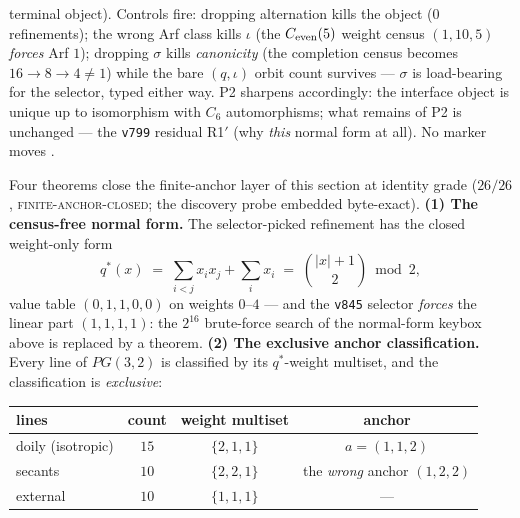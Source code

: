 \begin{keybox}
terminal object).  Controls fire: dropping alternation kills the
object ($0$ refinements); the wrong Arf class kills $\iota$ (the
$C_{\rm even}(5)$ weight census $(1,10,5)$ \emph{forces} Arf
$1$); dropping $\sigma$ kills \emph{canonicity} (the completion
census becomes $16 \to 8 \to 4 \ne 1$) while the bare
$(q,\iota)$ orbit count survives --- $\sigma$ is load-bearing
for the selector, typed either way.  P2 sharpens accordingly:
the interface object is unique up to isomorphism with $C_6$
automorphisms; what remains of P2 is unchanged --- the
\texttt{v799} residual R1$'$ (why \emph{this} normal form at
all).  No marker moves \mE.
\end{keybox}

\begin{keybox}[The four finite anchor theorems (2026-08-09) --- the census-free $q^{*}$, the exclusive anchor classification, the doily as a multiplication table, and the $g=5$ exhaustion \mE\ (\veri{v880\_finite\_anchor\_theorems.py})]
Four theorems close the finite-anchor layer of this section at
identity grade ($26/26$, \textsc{finite-anchor-closed}; the
discovery probe embedded byte-exact).  \textbf{(1) The
census-free normal form.}  The selector-picked refinement has the
closed weight-only form
\[
q^{*}(x) \;=\; \sum_{i<j} x_i x_j + \sum_i x_i
\;=\; \binom{|x|+1}{2} \bmod 2,
\]
value table $(0,1,1,0,0)$ on weights $0$--$4$ --- and the
\texttt{v845} selector \emph{forces} the linear part $(1,1,1,1)$:
the $2^{16}$ brute-force search of the normal-form keybox above is
replaced by a theorem.  \textbf{(2) The exclusive anchor
classification.}  Every line of $PG(3,2)$ is classified by its
$q^{*}$-weight multiset, and the classification is
\emph{exclusive}:

\begin{center}
\begin{tabular}{lccc}
lines & count & weight multiset & anchor\\
\hline
doily (isotropic) & $15$ & $\{2,1,1\}$ & $a = (1,1,2)$\\
secants & $10$ & $\{2,2,1\}$ & the \emph{wrong} anchor $(1,2,2)$\\
external & $10$ & $\{1,1,1\}$ & ---\\
\end{tabular}
\end{center}


\end{keybox}
